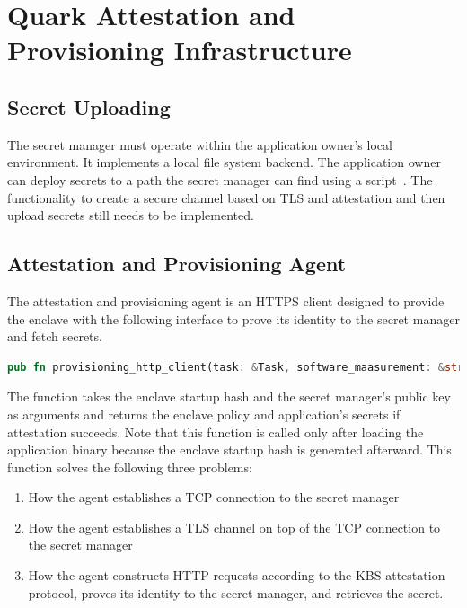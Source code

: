 \section{Quark Attestation and Provisioning Infrastructure}
\label{sec:impl_attestation_infr}

\subsection{Secret Uploading}
The secret manager must operate within the application owner's local environment. It implements a local file system backend. The application owner can deploy secrets to a path the secret manager can find using a script~\cite*{secret_uploading_script}. The functionality to create a secure channel 
based on TLS and attestation and then upload secrets still needs to be implemented.

\subsection{Attestation and Provisioning Agent}
The attestation and provisioning agent is an HTTPS client designed to provide the enclave with the following interface to prove its identity to the secret manager and fetch secrets.

\begin{lstlisting}[language=rust, caption= API of the atestation and provisioning agent]
    pub fn provisioning_http_client(task: &Task, software_maasurement: &str, sm_cert: Vec<u8>) -> Result<(KbsPolicy, KbsSecrets)>
\end{lstlisting}

The function takes the enclave startup hash and the secret manager’s public key as arguments and returns the enclave policy and application’s secrets if attestation succeeds. Note that this function is called only after loading the application binary because the enclave startup hash is 
generated afterward. This function solves the following three problems:

\begin{enumerate}
    \item How the agent establishes a TCP connection to the secret manager
    \item How the agent establishes a TLS channel on top of the TCP connection to the secret manager
    \item How the agent constructs HTTP requests according to the KBS attestation protocol, proves its identity to the secret manager, and retrieves the secret.
\end{enumerate}

